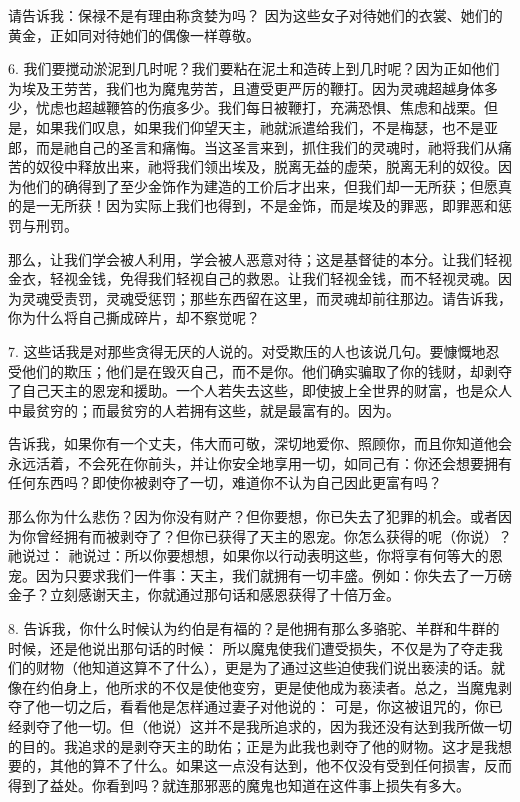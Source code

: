 请告诉我：保禄不是有理由称贪婪为吗？ 因为这些女子对待她们的衣裳、她们的黄金，正如同对待她们的偶像一样尊敬。\par

6. 我们要搅动淤泥到几时呢？我们要粘在泥土和造砖上到几时呢？因为正如他们为埃及王劳苦，我们也为魔鬼劳苦，且遭受更严厉的鞭打。因为灵魂超越身体多少，忧虑也超越鞭笞的伤痕多少。我们每日被鞭打，充满恐惧、焦虑和战栗。但是，如果我们叹息，如果我们仰望天主，祂就派遣给我们，不是梅瑟，也不是亚郎，而是祂自己的圣言和痛悔。当这圣言来到，抓住我们的灵魂时，祂将我们从痛苦的奴役中释放出来，祂将我们领出埃及，脱离无益的虚荣，脱离无利的奴役。因为他们的确得到了至少金饰作为建造的工价后才出来，但我们却一无所获；但愿真的是一无所获！因为实际上我们也得到，不是金饰，而是埃及的罪恶，即罪恶和惩罚与刑罚。\par

那么，让我们学会被人利用，学会被人恶意对待；这是基督徒的本分。让我们轻视金衣，轻视金钱，免得我们轻视自己的救恩。让我们轻视金钱，而不轻视灵魂。因为灵魂受责罚，灵魂受惩罚；那些东西留在这里，而灵魂却前往那边。请告诉我，你为什么将自己撕成碎片，却不察觉呢？\par

7. 这些话我是对那些贪得无厌的人说的。对受欺压的人也该说几句。要慷慨地忍受他们的欺压；他们是在毁灭自己，而不是你。他们确实骗取了你的钱财，却剥夺了自己天主的恩宠和援助。一个人若失去这些，即使披上全世界的财富，也是众人中最贫穷的；而最贫穷的人若拥有这些，就是最富有的。因为。\par

告诉我，如果你有一个丈夫，伟大而可敬，深切地爱你、照顾你，而且你知道他会永远活着，不会死在你前头，并让你安全地享用一切，如同己有：你还会想要拥有任何东西吗？即使你被剥夺了一切，难道你不认为自己因此更富有吗？\par

那么你为什么悲伤？因为你没有财产？但你要想，你已失去了犯罪的机会。或者因为你曾经拥有而被剥夺了？但你已获得了天主的恩宠。你怎么获得的呢（你说）？祂说过： 祂说过：所以你要想想，如果你以行动表明这些，你将享有何等大的恩宠。因为只要求我们一件事：天主，我们就拥有一切丰盛。例如：你失去了一万磅金子？立刻感谢天主，你就通过那句话和感恩获得了十倍万金。\par

8. 告诉我，你什么时候认为约伯是有福的？是他拥有那么多骆驼、羊群和牛群的时候，还是他说出那句话的时候： 所以魔鬼使我们遭受损失，不仅是为了夺走我们的财物（他知道这算不了什么），更是为了通过这些迫使我们说出亵渎的话。就像在约伯身上，他所求的不仅是使他变穷，更是使他成为亵渎者。总之，当魔鬼剥夺了他一切之后，看看他是怎样通过妻子对他说的： 可是，你这被诅咒的，你已经剥夺了他一切。但（他说）这并不是我所追求的，因为我还没有达到我所做一切的目的。我追求的是剥夺天主的助佑；正是为此我也剥夺了他的财物。这才是我想要的，其他的算不了什么。如果这一点没有达到，他不仅没有受到任何损害，反而得到了益处。你看到吗？就连那邪恶的魔鬼也知道在这件事上损失有多大。\par

